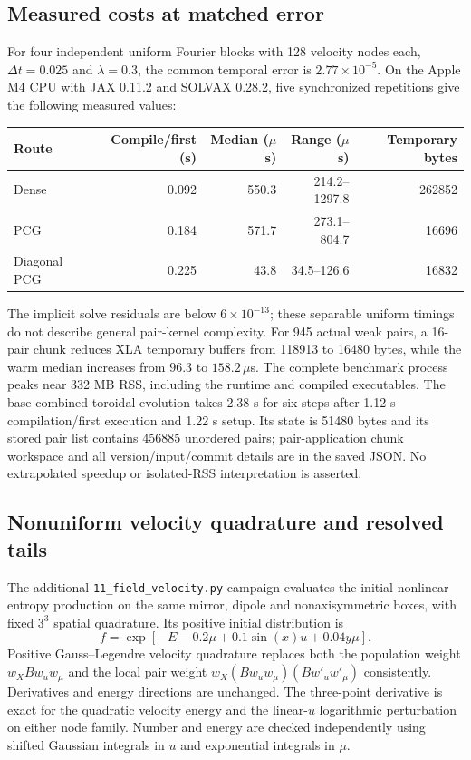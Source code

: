 \documentclass[11pt,letterpaper]{article}
\begin{document}
\subsection*{Measured costs at matched error}
For four independent uniform Fourier blocks with 128 velocity nodes each,
$\Delta t=0.025$ and $\lambda=0.3$, the common temporal error is
$2.77\times10^{-5}$. On the Apple M4 CPU with JAX 0.11.2 and SOLVAX 0.28.2,
five synchronized repetitions give the following measured values:
\begin{center}
\begin{tabular}{lrrrr}
\toprule
Route & Compile/first (s) & Median ($\mu$s) & Range ($\mu$s) & Temporary bytes\\
\midrule
Dense & 0.092 & 550.3 & 214.2--1297.8 & 262852\\
PCG & 0.184 & 571.7 & 273.1--804.7 & 16696\\
Diagonal PCG & 0.225 & 43.8 & 34.5--126.6 & 16832\\
\bottomrule
\end{tabular}
\end{center}
The implicit solve residuals are below $6\times10^{-13}$; these separable
uniform timings do not describe general pair-kernel complexity. For 945 actual
weak pairs, a 16-pair chunk reduces XLA temporary buffers from 118913 to 16480
bytes, while the warm median increases from $96.3$ to $158.2\,\mu$s.
The complete benchmark process peaks near 332 MB RSS, including the runtime
and compiled executables. The base combined toroidal evolution takes 2.38 s
for six steps after 1.12 s compilation/first execution and 1.22 s setup.
Its state is 51480 bytes and its stored pair list contains 456885 unordered
pairs; pair-application chunk workspace and all version/input/commit details
are in the saved JSON. No extrapolated speedup or isolated-RSS interpretation
is asserted.



\subsection*{Nonuniform velocity quadrature and resolved tails}
The additional \texttt{11\_field\_velocity.py} campaign evaluates the initial
nonlinear entropy production on the same mirror, dipole and nonaxisymmetric
boxes, with fixed $3^3$ spatial quadrature. Its positive initial distribution is
\begin{equation}
 f=\exp[-E-0.2\mu+0.1\sin(x)u+0.04y\mu].
\end{equation}
Positive Gauss--Legendre velocity quadrature replaces both the population
weight $w_X B w_u w_\mu$ and the local pair weight
$w_X(Bw_uw_\mu)(Bw'_uw'_\mu)$ consistently. Derivatives and energy directions
are unchanged. The three-point derivative is exact for the quadratic velocity
energy and the linear-$u$ logarithmic perturbation on either node family.
Number and energy are checked independently using shifted Gaussian integrals
in $u$ and exponential integrals in $\mu$.
\end{document}
